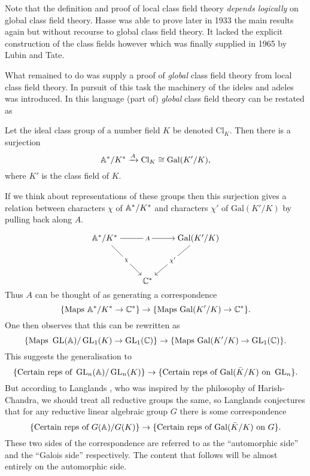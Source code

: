 Note that the definition and proof of local class field theory \textit{depends logically} on global class field theory. Hasse was able to prove later in 1933 the main results again but without recourse to global class field theory. It lacked the explicit construction of the class fields however which was finally supplied in 1965 by Lubin and Tate.

What remained to do was supply a proof of \textit{global} class field theory from local class field theory. In pursuit of this task the machinery of the ideles and adeles was introduced. In this language (part of) \textit{global} class field theory can be restated as 
\begin{Theorem}
	Let the ideal class group of a number field \(K\) be denoted \(\mathrm{Cl}_K\). Then there is a surjection
	\[ \A^*/ K^* \xrightarrow{A} \mathrm{Cl}_K \cong \mathrm{Gal}(K'/K),\]
	where \(K'\) is the class field of \(K\).
\end{Theorem}
If we think about representations of these groups then this surjection gives a relation between characters \(\chi\) of \(\A^*/K^*\) and characters \(\chi'\) of \(\mathrm{Gal}(K'/K)\) by pulling back along \(A\).

\[\begin{tikzcd}[cramped]
	{\A^*/K^*} && {\mathrm{Gal}(K'/K)} \\
	\\
	& {\C^*}
	\arrow["A"{description}, from=1-1, to=1-3]
	\arrow["\chi"{description}, from=1-1, to=3-2]
	\arrow["{\chi'}"{description}, from=1-3, to=3-2]
\end{tikzcd}\]
Thus \(A\) can be thought of as generating a correspondence
\[\{\text{Maps }\A^*/K^*\to \C^*\} \to\{ \text{Maps }\mathrm{Gal}(K'/K)\to \C^*\}. \]
One then observes that this can be rewritten as 
\[\{\text{Maps }\GL(\A)/\GL_1(K)\to \GL_1(\C)\} \to\{ \text{Maps }\mathrm{Gal}(K'/K)\to \GL_1(\C)\} .\]
This suggests the generalisation to 
\[\{\text{Certain reps of }\GL_n(\A)/\GL_n(K)\} \to\{ \text{Certain reps of  }\mathrm{Gal}(\bar{K}/K)\text{ on } \GL_n\}   .\]
But according to Langlands \cite{langlandsRepresentationTheoryIts1989}, who was inspired by the philosophy of Harish-Chandra, we should treat all reductive groups the same, so Langlands conjectures that for any reductive linear algebraic group \(G\) there is some correspondence
\[\{\text{Certain reps of }G(\A)/G(K)\} \to\{ \text{Certain reps of  }\mathrm{Gal}(\bar{K}/K)\text{ on } G\} .\]
These two sides of the correspondence are referred to as the ``automorphic side'' and the ``Galois side'' respectively. The content that follows will be almost entirely on the automorphic side. 



